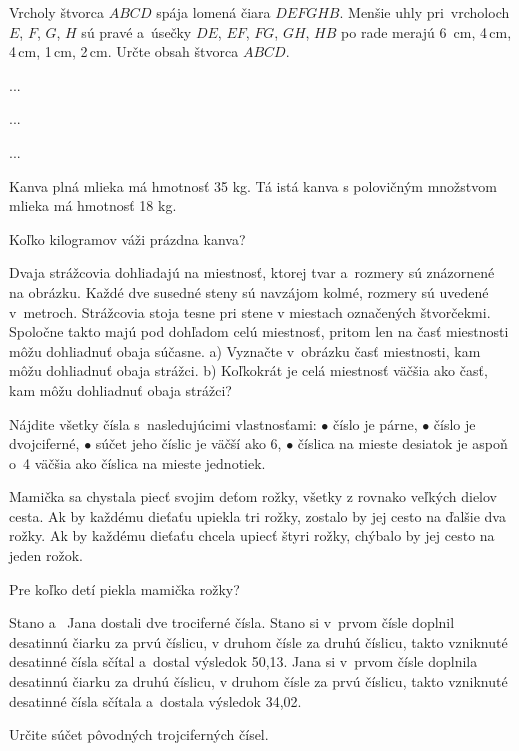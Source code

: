 {%
Vrcholy štvorca $ABCD$ spája lomená čiara $DEFGHB$.
Menšie uhly pri~vrcholoch $E$, $F$, $G$, $H$ sú pravé a~úsečky $DE$, $EF$, $FG$, $GH$, $HB$ po rade merajú 6\, cm, 4\,cm, 4\,cm, 1\,cm, 2\,cm.
Určte obsah štvorca $ABCD$.
%
}

{%
...}

{%
...}

{%
...}

{%
Kanva plná mlieka má hmotnosť 35 kg.
Tá istá kanva s polovičným množstvom mlieka má hmotnosť 18 kg.

Koľko kilogramov váži prázdna kanva?}

{%
Dvaja strážcovia dohliadajú na miestnosť, ktorej tvar a~rozmery sú znázornené na obrázku.
Každé dve susedné steny sú navzájom kolmé, rozmery sú uvedené v~metroch.
Strážcovia stoja tesne pri stene v miestach označených štvorčekmi. Spoločne takto majú pod dohľadom celú miestnosť, pritom len na časť miestnosti môžu dohliadnuť obaja súčasne.
\ite a) Vyznačte v~obrázku časť miestnosti, kam môžu dohliadnuť obaja strážci.
\ite b) Koľkokrát je celá miestnosť väčšia ako časť, kam môžu dohliadnuť obaja strážci?
%
}

{%
Nájdite všetky čísla s~nasledujúcimi vlastnosťami:
\ite $\bullet$ číslo je párne,
\ite $\bullet$ číslo je dvojciferné,
\ite $\bullet$ súčet jeho číslic je väčší ako 6,
\ite $\bullet$ číslica na mieste desiatok je aspoň o~4 väčšia ako číslica na mieste jednotiek.
}

{%
Mamička sa chystala piecť svojim deťom rožky, všetky z rovnako veľkých dielov cesta.
Ak by každému dieťaťu upiekla tri rožky, zostalo by jej cesto na ďalšie dva rožky.
Ak by každému dieťaťu chcela upiecť štyri rožky, chýbalo by jej cesto na jeden rožok.

Pre koľko detí piekla mamička rožky?}

{%
Stano a ~Jana dostali dve trociferné čísla.
Stano si v~prvom čísle doplnil desatinnú čiarku za prvú číslicu, v druhom čísle za druhú číslicu, takto vzniknuté desatinné čísla sčítal a~dostal výsledok
50{,}13.
Jana si v~prvom čísle doplnila desatinnú čiarku za druhú číslicu, v druhom čísle za prvú číslicu, takto vzniknuté desatinné čísla sčítala a~dostala výsledok
34{,}02.

Určite súčet pôvodných trojciferných čísel.}

